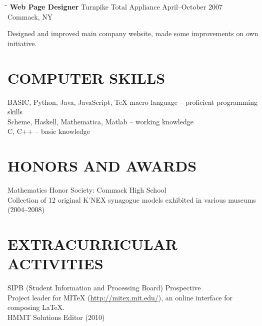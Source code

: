 \documentclass{res}
\begin{document}
\begin{resume}
   \begin{tabbing}
   \hspace{2.3in}\= \hspace{2.6in}\= \kill %
    {\bf Web Page Designer} \>Turnpike Total Appliance     \>April--October 2007\\
                             \>Commack, NY
   \end{tabbing}\vspace{-20pt}      %
    Designed and improved main company website, made some improvements on own initiative.
          


\section{COMPUTER SKILLS}          
    BASIC, Python, Java, JavaScript, \TeX{} macro language -- proficient programming skills \\
    Scheme, Haskell, Mathematica, Matlab -- working knowledge \\
    C, C++ -- basic knowledge
 
 
\section{HONORS AND AWARDS}          
    Mathematics Honor Society: Commack High School  \\        
    Collection of 12 original K'NEX synagogue models exhibited in various museums (2004--2008)
 
\section{EXTRACURRICULAR ACTIVITIES}          
    SIPB (Student Information and Processing Board) Prospective \\
    \indent Project leader for MITeX (\url{http://mitex.mit.edu/}), an online interface for composing \LaTeX. \\
    HMMT Solutions Editor (2010)
    
 
\end{resume}
\end{document}
